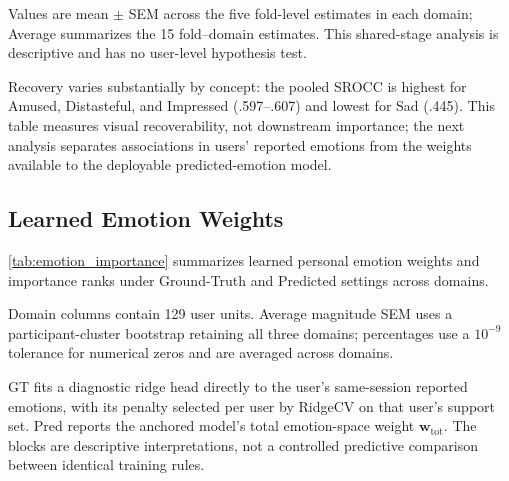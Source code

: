 \documentclass[10pt,twocolumn,letterpaper]{article}
\begin{document}
\begin{table}[!tbp]
    \centering
    \begin{threeparttable}
    \caption{Stage-1 emotion extraction accuracy by visual domain.}
    \label{tab:stage1_accuracy}
    \small
    \setlength{\tabcolsep}{4.5pt}
    
    \begin{tablenotes}[flushleft]\footnotesize
        \item Values are mean $\pm$ SEM across the five fold-level estimates in each
        domain; Average summarizes the 15 fold--domain estimates. This shared-stage
        analysis is descriptive and has no user-level hypothesis test.
    \end{tablenotes}
    \end{threeparttable}
\end{table}
Recovery varies substantially by concept: the pooled SROCC is highest for
Amused, Distasteful, and Impressed (.597--.607) and lowest for Sad (.445).
This table measures visual recoverability, not downstream importance; the
next analysis separates associations in users' reported emotions from the
weights available to the deployable predicted-emotion model.

\subsection{Learned Emotion Weights}
\cref{tab:emotion_importance} summarizes learned personal emotion weights and importance ranks under Ground-Truth and Predicted settings across domains.

\begin{table}[!tbp]
\centering
\begin{threeparttable}
\caption{Mean absolute standardized emotion weights ($\pm$ SEM), percentage
of positive coefficients, and within-setting importance rank.}
\label{tab:emotion_importance}
\small
\setlength{\tabcolsep}{3.5pt}

\begin{tablenotes}[flushleft]\footnotesize
\item Domain columns contain 129 user units. Average magnitude SEM uses a
participant-cluster bootstrap retaining all three domains; percentages use a
$10^{-9}$ tolerance for numerical zeros and are averaged across domains.
\item GT fits a diagnostic ridge head directly to the user's same-session
reported emotions, with its penalty selected per user by RidgeCV on that
user's support set. Pred reports the anchored model's total emotion-space
weight $\mathbf w_{\mathrm{tot}}$. The blocks are descriptive interpretations,
not a controlled predictive comparison between identical training rules.
\end{tablenotes}
\end{threeparttable}
\end{table}
\end{document}
